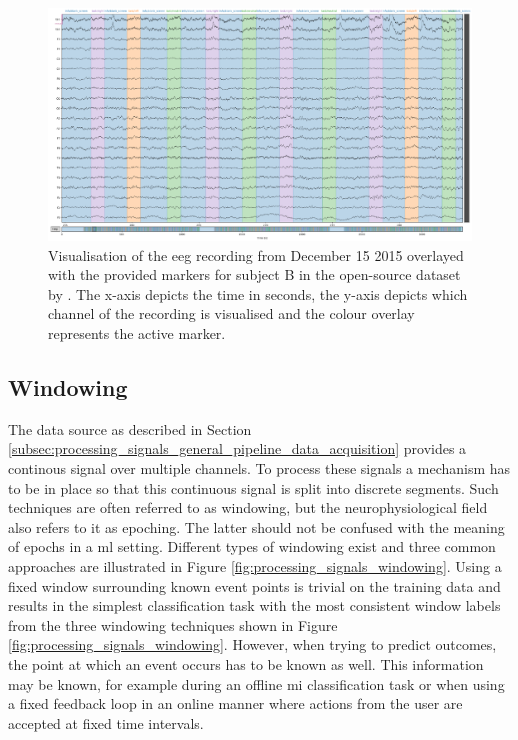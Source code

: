 \begin{figure}[ht]
    \centering
    \includegraphics[width=\linewidth]{../images/pipeline/eeg.pdf}
    \captionsetup{width=0.9\linewidth}
    \captionsetup{justification=centering}
    \caption{Visualisation of the \gls{eeg} recording from December 15 2015 overlayed with the provided markers for subject B in the open-source dataset by \citet{eeg_data}. The x-axis depicts the time in seconds, the y-axis depicts which channel of the recording is visualised and the colour overlay represents the active marker.}
    \label{fig:processing_signals_data_source_eeg}
\end{figure}


\subsection{Windowing}
\label{subsec:processing_signals_general_pipeline_windowing}

The data source as described in Section \ref{subsec:processing_signals_general_pipeline_data_acquisition} provides a continous signal over multiple channels.
To process these signals a mechanism has to be in place so that this continuous signal is split into discrete segments.
Such techniques are often referred to as windowing, but the neurophysiological field also refers to it as epoching.
The latter should not be confused with the meaning of epochs in a \gls{ml} setting.
Different types of windowing exist and three common approaches are illustrated in Figure \ref{fig:processing_signals_windowing}.
Using a fixed window surrounding known event points is trivial on the training data and results in the simplest classification task with the most consistent window labels from the three windowing techniques shown in Figure \ref{fig:processing_signals_windowing}.
However, when trying to predict outcomes, the point at which an event occurs has to be known as well.
This information may be known, for example during an offline \gls{mi} classification task or when using a fixed feedback loop in an online manner where actions from the user are accepted at fixed time intervals.

